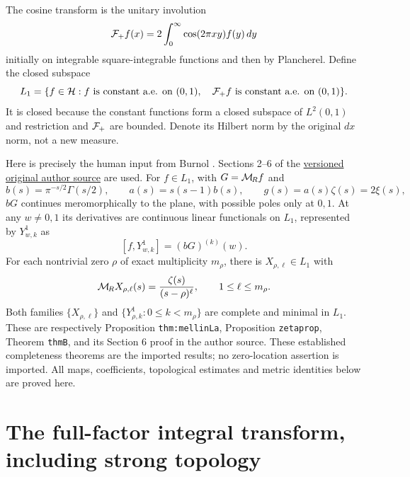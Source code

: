 \documentclass[11pt]{article}
\begin{document}
The cosine transform is the unitary involution
\[
 \mathcal F_+ f(x)=2\int_0^\infty\cos(2\pi xy)f(y)\,dy
\]
initially on integrable square-integrable functions and then by
Plancherel. Define the closed subspace
\[
 L_1=\{f\in\mathcal H:f\text{ is constant a.e. on }(0,1),\quad
                      \mathcal F_+ f\text{ is constant a.e. on }(0,1)\}.
\]
It is closed because the constant functions form a closed subspace
of $L^2(0,1)$ and restriction and $\mathcal F_+$ are bounded. Denote its
Hilbert norm by the original $dx$ norm, not a new measure.

Here is precisely the human input from Burnol \cite{mburn:Burnol}.
Sections 2--6 of the
\href{https://arxiv.org/abs/math/0203120v7}{versioned original author source}
are used.
For $f\in L_1$, with $G=\mathcal M_{\!R} f$ and
\begin{equation}\label{mburn:eq:abg}
 b(s)=\pi^{-s/2}\Gamma(s/2),\qquad
 a(s)=s(s-1)b(s),\qquad g(s)=a(s)\zeta(s)=2\xi(s),
\end{equation}
$bG$ continues meromorphically to the plane, with possible poles
only at $0,1$. At any $w\ne0,1$ its derivatives are continuous
linear functionals on $L_1$, represented by $Y^1_{w,k}$ as
\begin{equation}\label{mburn:eq:burnol-eval}
 [f,Y^1_{w,k}]=(bG)^{(k)}(w).
\end{equation}
For each nontrivial zero $\rho$ of exact multiplicity $m_\rho$,
there is $X_{\rho,\ell}\in L_1$ with
\begin{equation}\label{mburn:eq:X}
 \mathcal M_{\!R} X_{\rho,\ell}(s)=\frac{\zeta(s)}{(s-\rho)^\ell},
                 \qquad 1\leq\ell\leq m_\rho.
\end{equation}
Both families $\{X_{\rho,\ell}\}$ and
$\{Y^1_{\rho,k}:0\leq k<m_\rho\}$ are complete and minimal in
$L_1$. These are respectively Proposition \texttt{thm:mellinLa},
Proposition \texttt{zetaprop}, Theorem \texttt{thmB}, and its
Section 6 proof in the author source. These established completeness
theorems are the imported results; no zero-location assertion is
imported. All maps, coefficients, topological estimates and metric
identities below are proved here.

\section{The full-factor integral transform, including strong topology}
\end{document}
